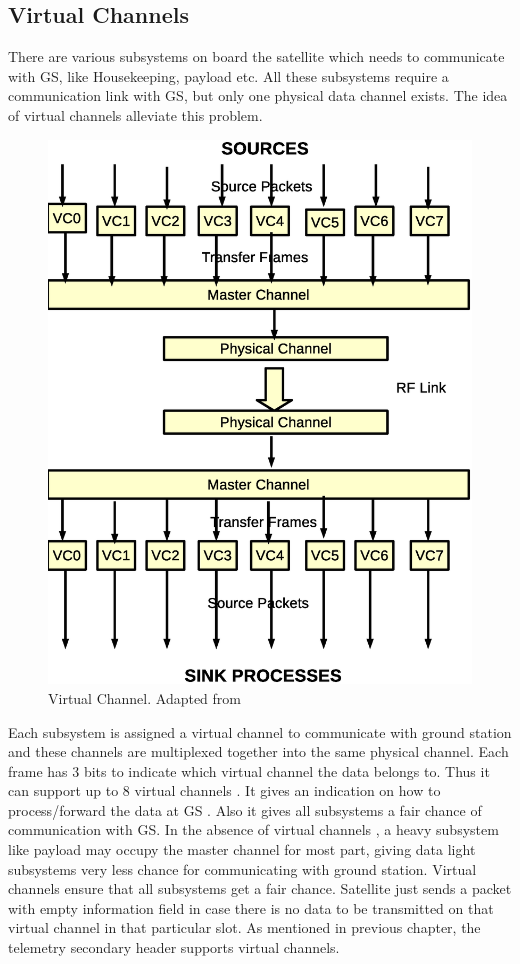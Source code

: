 \documentclass[BTech]{iitmdiss}
\begin{document}
\subsection{Virtual Channels}
There are various subsystems on board the satellite which needs to communicate with GS, like Housekeeping, payload  etc. All these subsystems require a communication link with GS, but only one physical data channel exists. The idea of virtual channels alleviate this problem. 
\begin{figure}[H]
\includegraphics[scale = 0.65]{vc.eps}
\caption{Virtual Channel. Adapted from \citep{ccsds102}}
\label{fig:vc}
\end{figure}

\par Each subsystem is assigned a virtual channel to communicate with ground station and these channels are multiplexed together into the same physical channel. Each frame has 3 bits to indicate which virtual channel the data  belongs to. Thus it can support up to 8 virtual channels . It gives an indication on how to process/forward  the data at GS . Also it gives all subsystems a fair chance of communication with GS. In the absence of virtual channels , a heavy subsystem like payload may occupy the master channel for most part, giving data light subsystems very less chance for communicating with ground station. Virtual channels ensure that all subsystems get a fair chance. Satellite just sends a packet with empty information field in case there is no data to be transmitted on that virtual channel in that particular slot.  As mentioned in previous chapter, the telemetry secondary header supports virtual channels. 
\end{document}
